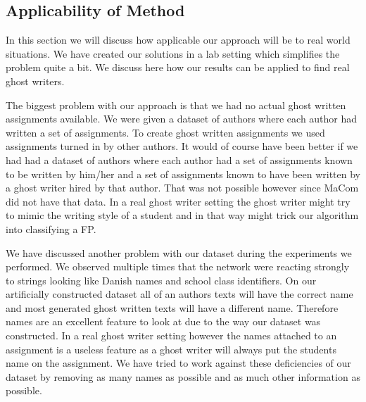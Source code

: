 \subsection{Applicability of Method}\label{sec:app_of_method}

In this section we will discuss how applicable our approach will be to real
world situations. We have created our solutions in a lab setting which
simplifies the problem quite a bit. We discuss here how our results can be
applied to find real ghost writers.

The biggest problem with our approach is that we had no actual ghost written
assignments available. We were given a dataset of authors where each author had
written a set of assignments. To create ghost written assignments we used
assignments turned in by other authors. It would of course have been better if
we had had a dataset of authors where each author had a set of assignments known
to be written by him/her and a set of assignments known to have been written by
a ghost writer hired by that author. That was not possible however since MaCom
did not have that data. In a real ghost writer setting the ghost writer might
try to mimic the writing style of a student and in that way might trick our
algorithm into classifying a \gls{FP}.

We have discussed another problem with our dataset during the experiments we
performed. We observed multiple times that the network were reacting strongly
to strings looking like Danish names and school class identifiers. On our
artificially constructed dataset all of an authors texts will have the correct
name and most generated ghost written texts will have a different name.
Therefore names are an excellent feature to look at due to the way our dataset
was constructed. In a real ghost writer setting however the names attached to an
assignment is a useless feature as a ghost writer will always put the students
name on the assignment. We have tried to work against these deficiencies of our
dataset by removing as many names as possible and as much other information as
possible.

